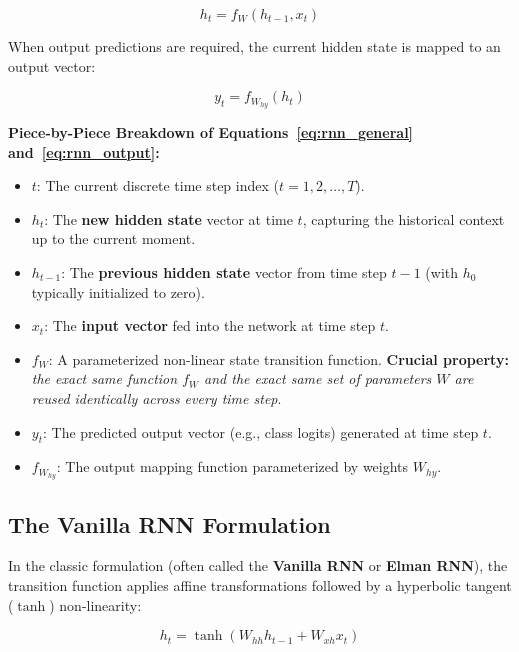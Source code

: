 \begin{equation}
h_t = f_W(h_{t-1}, x_t)
\label{eq:rnn_general}
\end{equation}

When output predictions are required, the current hidden state is mapped to an output vector:

\begin{equation}
y_t = f_{W_{hy}}(h_t)
\label{eq:rnn_output}
\end{equation}

\begin{Notebox}
\textbf{Piece-by-Piece Breakdown of Equations~\ref{eq:rnn_general} and~\ref{eq:rnn_output}:}
\begin{itemize}[nosep, leftmargin=*]
    \item $t$: The current discrete time step index ($t = 1, 2, \dots, T$).
    \item $h_t$: The \textbf{new hidden state} vector at time $t$, capturing the historical context up to the current moment.
    \item $h_{t-1}$: The \textbf{previous hidden state} vector from time step $t-1$ (with $h_0$ typically initialized to zero).
    \item $x_t$: The \textbf{input vector} fed into the network at time step $t$.
    \item $f_W$: A parameterized non-linear state transition function. \textbf{Crucial property:} \textit{the exact same function $f_W$ and the exact same set of parameters $W$ are reused identically across every time step}.
    \item $y_t$: The predicted output vector (e.g., class logits) generated at time step $t$.
    \item $f_{W_{hy}}$: The output mapping function parameterized by weights $W_{hy}$.
\end{itemize}
\end{Notebox}

\subsection{The Vanilla RNN Formulation}

In the classic formulation (often called the \textbf{Vanilla RNN} or \textbf{Elman RNN}), the transition function applies affine transformations followed by a hyperbolic tangent ($\tanh$) non-linearity:

\begin{equation}
h_t = \tanh(W_{hh} h_{t-1} + W_{xh} x_t)
\label{eq:vanilla_rnn_state}
\end{equation}

